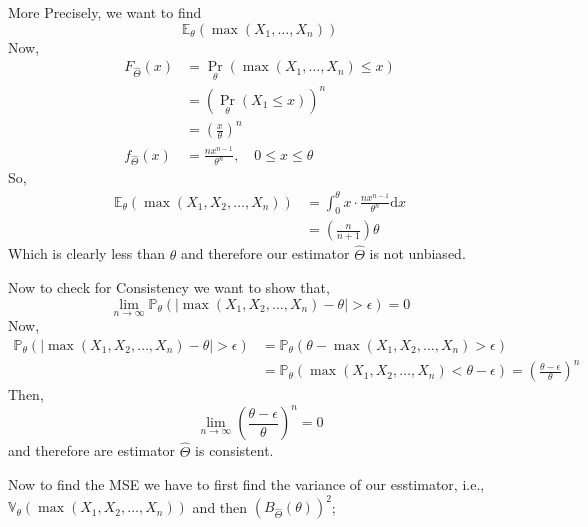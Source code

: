 \documentclass[12pt,a4paper]{article}
\begin{document}
   More Precisely, we want to find 
   \begin{equation*}
    \mathbb{E}_{\theta}(\max(X_{1},\ldots,X_{n}))
   \end{equation*}    
   Now,
   \begin{align*}
    F_{\hat{\Theta}}(x)&= \Pr_{\theta}(\max(X_{1},\ldots,X_{n})\leq x) \\
    &= (\Pr_{\theta}\left( X_{1}\leq x \right))^n \\
    &= \left( \frac{x}{\theta} \right)^n\\
    f_{\hat{\Theta}}(x)&= \frac{nx^{n-1}}{\theta^n},  \quad 0\leq x\leq \theta
   \end{align*}
   So,
   \begin{align*}
       \mathbb{E}_{\theta}\left( \max\left( X_{1},X_{2},\ldots,X_{n} \right)  \right)&= \int_{0}^{\theta} x\cdot \frac{n x^{n-1}}{\theta^n} \mathrm{d}x \\
       &= \left(\frac{n}{n+1}\right)\theta
   \end{align*}    
   Which is clearly less than \(\theta\) and therefore our estimator \( \hat{\Theta}\) is not unbiased.  
   
   Now to check for Consistency we want to show that,
   \begin{equation*}
       \lim_{n\to \infty} \mathbb{P}_{\theta}\left( |\max\left( X_{1},X_{2},\ldots,X_{n} \right) - \theta | > \epsilon \right) =0
   \end{equation*} 
   Now, 
   \begin{align*}
    \mathbb{P}_{\theta}\left( |\max\left( X_{1},X_{2},\ldots,X_{n} \right) - \theta | > \epsilon \right)&= \mathbb{P}_{\theta}\left( \theta - \max\left( X_{1},X_{2},\ldots,X_{n} \right)>\epsilon  \right)\\
    &=\mathbb{P}_{\theta}\left( \max\left( X_{1},X_{2},\ldots,X_{n} \right) < \theta - \epsilon  \right) = \left(\frac{\theta - \epsilon}{\theta}\right)^n
   \end{align*}
   Then,
   \begin{equation*}
    \lim_{n\to \infty}\left(\frac{\theta - \epsilon}{\theta}\right)^n=0 
   \end{equation*}
   and therefore are estimator \(\hat{\Theta}\) is consistent.
   
   
   Now to find the MSE we have to first find the variance of our esstimator, i.e., \(\mathbb{V}_{\theta}(\max\left( X_{1},X_{2},\ldots,X_{n} \right))\) and then \(\left( B_{\hat{\Theta}}(\theta) \right)^2 \);
   
\end{document}
